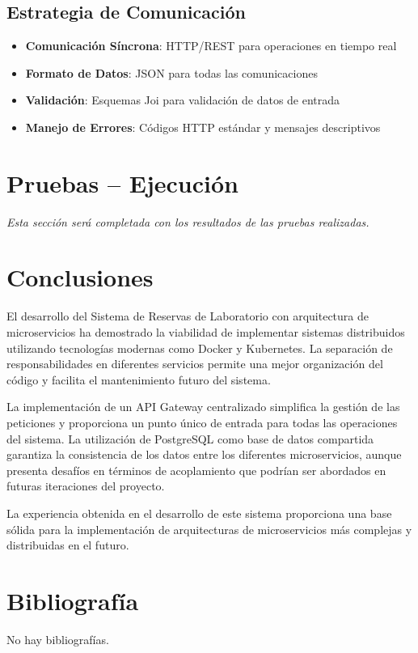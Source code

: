 \documentclass[12pt,a4paper]{article}
\begin{document}
\subsection{Estrategia de Comunicación}

\begin{itemize}
    \item \textbf{Comunicación Síncrona}: HTTP/REST para operaciones en tiempo real
    \item \textbf{Formato de Datos}: JSON para todas las comunicaciones
    \item \textbf{Validación}: Esquemas Joi para validación de datos de entrada
    \item \textbf{Manejo de Errores}: Códigos HTTP estándar y mensajes descriptivos
\end{itemize}

\section{Pruebas – Ejecución}

\textit{Esta sección será completada con los resultados de las pruebas realizadas.}

\section{Conclusiones}

El desarrollo del Sistema de Reservas de Laboratorio con arquitectura de microservicios ha demostrado la viabilidad de implementar sistemas distribuidos utilizando tecnologías modernas como Docker y Kubernetes. La separación de responsabilidades en diferentes servicios permite una mejor organización del código y facilita el mantenimiento futuro del sistema.

La implementación de un API Gateway centralizado simplifica la gestión de las peticiones y proporciona un punto único de entrada para todas las operaciones del sistema. La utilización de PostgreSQL como base de datos compartida garantiza la consistencia de los datos entre los diferentes microservicios, aunque presenta desafíos en términos de acoplamiento que podrían ser abordados en futuras iteraciones del proyecto.

La experiencia obtenida en el desarrollo de este sistema proporciona una base sólida para la implementación de arquitecturas de microservicios más complejas y distribuidas en el futuro.

\section{Bibliografía}

No hay bibliografías.
\end{document}
